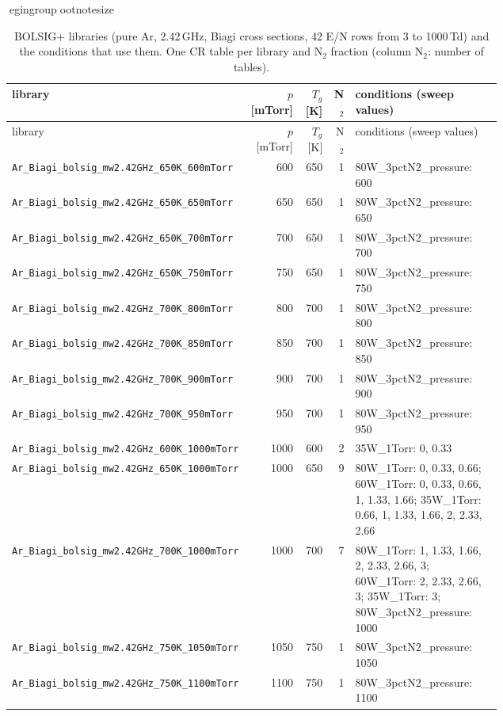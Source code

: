 egingroupootnotesize
\begin{longtable}{p{0.42\linewidth}rrrp{0.30\linewidth}}
\caption{BOLSIG+ libraries (pure Ar, 2.42\,GHz, Biagi cross sections, 42 E/N rows from 3 to 1000\,Td) and the conditions that use them. One CR table per library and N$_2$ fraction (column N$_2$: number of tables).}\label{tab:libraries}\\
\toprule library & $p$ [mTorr] & $T_g$ [K] & N$_2$ & conditions (sweep values) \\ \midrule\endfirsthead
\toprule library & $p$ [mTorr] & $T_g$ [K] & N$_2$ & conditions (sweep values) \\ \midrule\endhead
\texttt{Ar\_Biagi\_bolsig\_mw2.42GHz\_650K\_600mTorr} & 600 & 650 & 1 & 80W\_3pctN2\_pressure: 600 \\
\texttt{Ar\_Biagi\_bolsig\_mw2.42GHz\_650K\_650mTorr} & 650 & 650 & 1 & 80W\_3pctN2\_pressure: 650 \\
\texttt{Ar\_Biagi\_bolsig\_mw2.42GHz\_650K\_700mTorr} & 700 & 650 & 1 & 80W\_3pctN2\_pressure: 700 \\
\texttt{Ar\_Biagi\_bolsig\_mw2.42GHz\_650K\_750mTorr} & 750 & 650 & 1 & 80W\_3pctN2\_pressure: 750 \\
\texttt{Ar\_Biagi\_bolsig\_mw2.42GHz\_700K\_800mTorr} & 800 & 700 & 1 & 80W\_3pctN2\_pressure: 800 \\
\texttt{Ar\_Biagi\_bolsig\_mw2.42GHz\_700K\_850mTorr} & 850 & 700 & 1 & 80W\_3pctN2\_pressure: 850 \\
\texttt{Ar\_Biagi\_bolsig\_mw2.42GHz\_700K\_900mTorr} & 900 & 700 & 1 & 80W\_3pctN2\_pressure: 900 \\
\texttt{Ar\_Biagi\_bolsig\_mw2.42GHz\_700K\_950mTorr} & 950 & 700 & 1 & 80W\_3pctN2\_pressure: 950 \\
\texttt{Ar\_Biagi\_bolsig\_mw2.42GHz\_600K\_1000mTorr} & 1000 & 600 & 2 & 35W\_1Torr: 0, 0.33 \\
\texttt{Ar\_Biagi\_bolsig\_mw2.42GHz\_650K\_1000mTorr} & 1000 & 650 & 9 & 80W\_1Torr: 0, 0.33, 0.66; 60W\_1Torr: 0, 0.33, 0.66, 1, 1.33, 1.66; 35W\_1Torr: 0.66, 1, 1.33, 1.66, 2, 2.33, 2.66 \\
\texttt{Ar\_Biagi\_bolsig\_mw2.42GHz\_700K\_1000mTorr} & 1000 & 700 & 7 & 80W\_1Torr: 1, 1.33, 1.66, 2, 2.33, 2.66, 3; 60W\_1Torr: 2, 2.33, 2.66, 3; 35W\_1Torr: 3; 80W\_3pctN2\_pressure: 1000 \\
\texttt{Ar\_Biagi\_bolsig\_mw2.42GHz\_750K\_1050mTorr} & 1050 & 750 & 1 & 80W\_3pctN2\_pressure: 1050 \\
\texttt{Ar\_Biagi\_bolsig\_mw2.42GHz\_750K\_1100mTorr} & 1100 & 750 & 1 & 80W\_3pctN2\_pressure: 1100 \\

\end{longtable}
